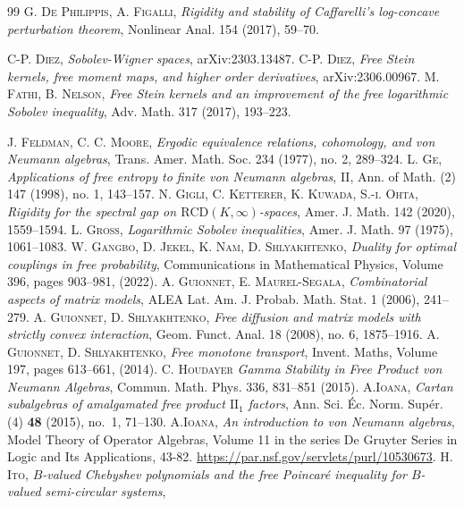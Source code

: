 \documentclass[10pt,a4paper,reqno]{amsart}
\begin{document}
\begin{thebibliography}{99}
\textsc{G. De Philippis, A. Figalli}, 
\textit{Rigidity and stability of Caffarelli’s log-concave perturbation theorem}, 
Nonlinear Anal. 154 (2017), 59–70.

\textsc{C-P. Diez}, 
\textit{Sobolev-Wigner spaces}, 
arXiv:2303.13487.
\textsc{C-P. Diez}, 
\textit{Free Stein kernels, free moment maps, and higher order derivatives}, 
arXiv:2306.00967.
\textsc{M. Fathi, B. Nelson}, 
\textit{Free Stein kernels and an improvement of the free logarithmic Sobolev inequality}, 
Adv. Math. 317 (2017), 193–223.

\textsc{J. Feldman, C. C. Moore}, 
\textit{Ergodic equivalence relations, cohomology, and von Neumann algebras}, 
Trans. Amer. Math. Soc. 234 (1977), no. 2, 289–324.
\textsc{L. Ge}, 
\textit{Applications of free entropy to finite von Neumann algebras},
II, Ann. of Math. (2) 147 (1998), no. 1,
143–157.
\textsc{N. Gigli, C. Ketterer, K. Kuwada, S.-i. Ohta}, 
\textit{Rigidity for the spectral gap on $\mathrm{RCD}(K,\infty)$-spaces}, 
Amer. J. Math. 142 (2020), 1559–1594.
\textsc{L. Gross}, 
\textit{Logarithmic Sobolev inequalities}, 
Amer. J. Math. 97 (1975), 1061–1083.
\textsc{W. Gangbo, D. Jekel, K. Nam, D. Shlyakhtenko}, 
\textit{Duality for optimal couplings in free probability}, 
Communications in Mathematical Physics, Volume 396, pages 903–981, (2022).
\textsc{A. Guionnet, E. Maurel-Segala}, 
\textit{Combinatorial aspects of matrix models}, 
ALEA Lat. Am. J. Probab. Math. Stat. 1 (2006), 241–279.
\textsc{A. Guionnet, D. Shlyakhtenko}, 
\textit{Free diffusion and matrix models with strictly convex interaction}, 
Geom. Funct. Anal. 18 (2008), no. 6, 1875–1916.
\textsc{A. Guionnet, D. Shlyakhtenko}, 
\textit{Free monotone transport},
Invent. Maths, Volume 197, pages 613–661, (2014).
\textsc{C. Houdayer}
\textit{Gamma Stability in Free Product von Neumann Algebras},
Commun. Math. Phys. 336, 831–851 (2015).
\textsc{A.Ioana},
\textit{Cartan subalgebras of amalgamated free product $\mathrm{II}_1$
factors}, 
Ann. Sci. Éc. Norm. Supér. (4) \textbf{48} (2015), no.~1, 71--130.
\textsc{A.Ioana},
\textit{An introduction to von Neumann algebras}, 
Model Theory of Operator Algebras, Volume 11 in the series De Gruyter Series in Logic and Its Applications, 43-82.
\url{https://par.nsf.gov/servlets/purl/10530673}.
\textsc{H. Ito},
\textit{$B$-valued Chebyshev polynomials and the free Poincaré inequality for $B$-valued semi-circular systems},

\end{thebibliography}
\end{document}
